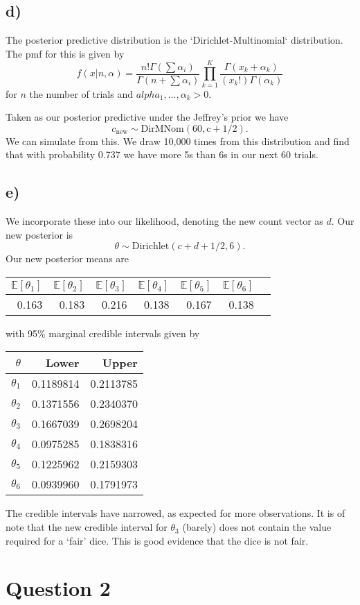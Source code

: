 \documentclass[12pt]{extarticle}
\newcommand{\E}{\mathbb{E}}
\begin{document}
\subsection*{d)}
The posterior predictive distribution is the `Dirichlet-Multinomial` distribution. The pmf for this is given by 
\[
f(x|n, \alpha) = \frac{n!\Gamma(\sum\alpha_i)}{\Gamma(n+\sum\alpha_i)}\prod_{k=1}^{K}\frac{\Gamma(x_k+\alpha_k)}{(x_k!)\Gamma(\alpha_k)}
\]
for $n$ the number of trials and $alpha_1, \dots, \alpha_k > 0.$ 

Taken as our posterior predictive under the Jeffrey's prior we have $$c_{\text{new}}\sim \mathrm{DirMNom(60, c + 1/2)}.$$
We can simulate from this. We draw 10,000 times from this distribution and find that with probability 0.737 we have more 5s than 6s in our next 60 trials.

\subsection*{e)}
We incorporate these into our likelihood, denoting the new count vector as $d$. Our new posterior is $$\theta \sim \mathrm{Dirichlet}(c+d+1/2, 6).$$ Our new posterior means are 
\begin{table}[H]
	\centering
	\begin{tabular}{rrrrrrr}
		\hline
		$\E\left[\theta_1\right]$ & $\E\left[\theta_2\right]$ & $\E\left[\theta_3\right]$ & $\E\left[\theta_4\right]$ & $\E\left[\theta_5\right]$ & $\E\left[\theta_6\right]$ \\ 
		\hline
		0.163 &0.183 &0.216 &0.138 &0.167 &0.138 \\ 
		\hline
	\end{tabular}
\end{table}
with 95\% marginal credible intervals given by 
\begin{table}[H]
	\centering
	\begin{tabular}{r|rr}
		\hline
		$\theta$ & Lower & Upper\\
		\hline
		$\theta_1$ &0.1189814 &0.2113785\\
		$\theta_2$ &0.1371556 &0.2340370\\
		$\theta_3$ &0.1667039 &0.2698204\\
		$\theta_4$ &0.0975285 &0.1838316\\
		$\theta_5$ &0.1225962 &0.2159303\\
		$\theta_6$ &0.0939960 &0.1791973\\
	\end{tabular}
\end{table}
The credible intervals have narrowed, as expected for more observations. It is of note that the new credible interval for $\theta_3$ (barely) does not contain the value required for a `fair' dice. This is good evidence that the dice is not fair. 

\section*{Question 2}
\end{document}

